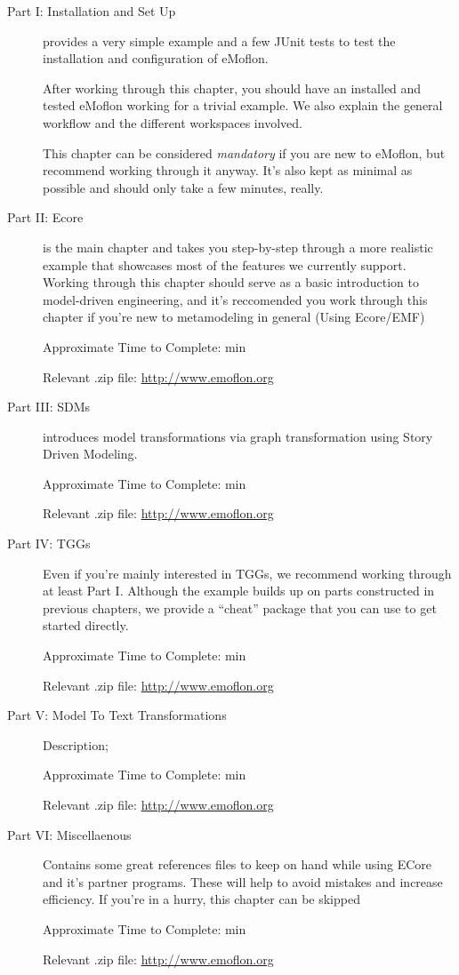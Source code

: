 \begin{description}

\item[Part I: Installation and Set Up]provides a very simple example and a few JUnit tests to test the installation and configuration of eMoflon.
 
After working through this chapter, you should have an installed and tested eMoflon working for a trivial example.
We also explain the general workflow and the different workspaces involved.

This chapter can be considered \emph{mandatory} if you are new to eMoflon, but recommend working through it anyway.
It's also kept as minimal as possible and should only take a few minutes, really.

\vspace{0.5cm}

\item[Part II: Ecore] is the main chapter and takes you step-by-step through a more realistic example that showcases most of the features we currently support.
Working through this chapter should serve as a basic introduction to model-driven engineering, and it's reccomended you work through this chapter if you're new to metamodeling in general (Using Ecore/EMF) %

{\small Approximate Time to Complete: min

Relevant .zip file: \url{http://www.emoflon.org} }

\item[Part III: SDMs] introduces model transformations via graph transformation using Story Driven Modeling.

{\small Approximate Time to Complete: min

Relevant .zip file: \url{http://www.emoflon.org} }

\item[Part IV: TGGs] Even if you're mainly interested in TGGs, we recommend working through at least Part I. Although the example builds up on parts constructed in previous chapters, we provide a ``cheat'' package that you can use to get started directly.

{\small Approximate Time to Complete: min

Relevant .zip file: \url{http://www.emoflon.org} }

\item[Part V: Model To Text Transformations] Description;

{\small Approximate Time to Complete: min

Relevant .zip file: \url{http://www.emoflon.org} }

\item[Part VI: Miscellaenous] Contains some great references files to keep on hand while using ECore and it's partner programs. These will help to avoid mistakes and increase efficiency. %
If you're in a hurry, this chapter can be skipped

{\small Approximate Time to Complete: min

Relevant .zip file: \url{http://www.emoflon.org} }

\end{description}

